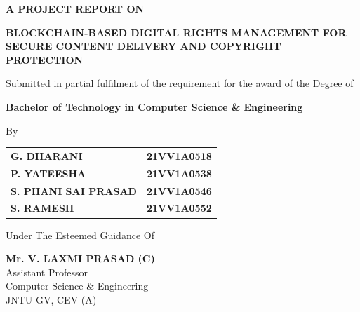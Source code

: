 \documentclass[12pt,a4paper]{report}
\begin{document}
\begin{titlepage}
    \begin{center}
        \vspace*{0.5cm}
        
        \large{\textbf{A PROJECT REPORT ON}}
        
        \vspace{1cm}
        
        \Large{\textbf{BLOCKCHAIN-BASED DIGITAL RIGHTS MANAGEMENT FOR SECURE CONTENT DELIVERY AND COPYRIGHT PROTECTION}}
        
        \vspace{1cm}
        
        \normalsize{Submitted in partial fulfilment of the requirement for the award of the Degree of}
        
        \vspace{0.5cm}
        
        \large{\textbf{Bachelor of Technology in Computer Science \& Engineering}}
        
        \vspace{1cm}
        
        \normalsize{By}
        
        \vspace{0.5cm}
        \begin{table}[h]
        \centering
        \begin{tabular}{ll}
            \textbf{G. DHARANI} & \textbf{21VV1A0518} \\
            \textbf{P. YATEESHA} & \textbf{21VV1A0538} \\
            \textbf{S. PHANI SAI PRASAD} & \textbf{21VV1A0546} \\
            \textbf{S. RAMESH} & \textbf{21VV1A0552}
        \end{tabular}
        \end{table}
        
        \vspace{1cm}
        
        \normalsize{Under The Esteemed Guidance Of}
        
        \vspace{0.2cm}
        \textbf{Mr. V. LAXMI PRASAD (C)}\\
        \normalsize{Assistant Professor}\\
        \normalsize{Computer Science \& Engineering}\\
        \normalsize{JNTU-GV, CEV (A)}
        

\end{center}
\end{titlepage}
\end{document}
